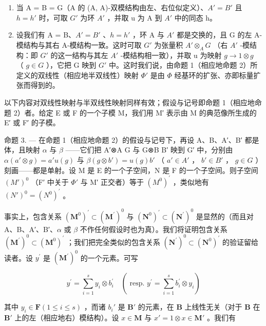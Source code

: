 \begin{enumerate}
\def\labelenumi{\arabic{enumi})}
\setcounter{enumi}{1}
\item
  当 A = B = G（A 的 (A, A)-双模结构由左、右位似定义）、\(A' = B'\) 且 \(h = h'\) 时，可取 \(G'\) 为环 \(A'\) ，并取 u 为 A 到 \(A'\) 中的同态 h。
\item
  设我们有 A = B、\(A' = B'\) 、\(h = h'\) ，环 A 与 \(A'\) 都是交换的，且 G 的左 A-模结构与其右 A-模结构一致。这时可取 \(G'\) 为张量积 \(A' \otimes_{A} G\) （右 \(A'\) -模结构：即 \(G'\) 的这一结构与其左 \(A'\) -模结构相一致），并取 u 为映射 \(g \to 1 \otimes g\) （ \(g \in G\) ），它把 G 映到 \(G'\) 中。这时我们说，由命题 1（相应地命题 2）所定义的双线性（相应地半双线性）映射 \(\Phi'\) 是由 \(\Phi\) 经基环的扩张、亦即标量扩张而得到的。
\end{enumerate}

以下内容对双线性映射与半双线性映射同样有效；假设与记号即命题 1（相应地命题 2）者。给定 E 或 F 的一个子模 M，我们用 M′ 表示由 M 的典范像所生成的 E′ 或 F′ 的子模。

命题 3. --- 在命题 1（相应地命题 2）的假设与记号下，再设 A、B、A′、B′ 都是体，且映射 \(\alpha\) 与 \(\beta\) ——它们把 A′⊗A G 与 G⊗B B′ 映到 G′ 中，分别由 \(\alpha(a'\otimes g)=a'u(g)\) 与 \(\beta(g\otimes b')=u(g)b'\) （ \(a'\in A'\) ， \(b'\in B'\) ， \(g\in G\) ）刻画——都是单射。设 M 是 E 的一个子空间，N 是 F 的一个子空间。则子空间 \((M')^{0}\) （F′ 中关于 \(\Phi'\) 与 M′ 正交者）等于 \((M^{0})^{\prime}\) ，类似地有 \((N')^{0} = (N^{0})^{\prime}\) 。

事实上，包含关系 \((\mathbf{M}^{0})^{\prime}\subset(\mathbf{M}^{\prime})^{0}\) 与 \((\mathbf{N}^{0})^{\prime}\subset(\mathbf{N}^{\prime})^{0}\) 是显然的（而且对 A、B、A′、B′、\(\alpha\) 或 \(\beta\) 不作任何假设时也为真）。我们将证明包含关系 \((\mathbf{M}^{\prime})^{0}\subset(\mathbf{M}^{0})^{\prime}\) ；我们把完全类似的包含关系 \((\mathbf{N}^{\prime})^{0}\subset(\mathbf{N}^{0})^{\prime}\) 的验证留给读者。设 \(y^{\prime}\) 是 \((\mathbf{M}^{\prime})^{0}\) 的一个元素。可写

\[
y ^ {\prime} = \sum_ {i = 1} ^ {s} y _ {i} \otimes b _ {i} ^ {\prime} \quad (\text { resp. } y ^ {\prime} = \sum_ {i = 1} ^ {s} b _ {i} ^ {\prime} \otimes y _ {i})
\]

其中 \(y_i \in \mathbf{F} (1 \leqslant i \leqslant s)\) ，而诸 \(b_i'\) 是 \(\mathbf{B}'\) 的元素，在 \(\mathbf{B}\) 上线性无关（对于 \(\mathbf{B}\) 在 \(\mathbf{B}'\) 上的左（相应地右）模结构）。设 \(x \in \mathbf{M}\) 与 \(x' = 1 \otimes x \in \mathbf{M}'\) 。我们有

